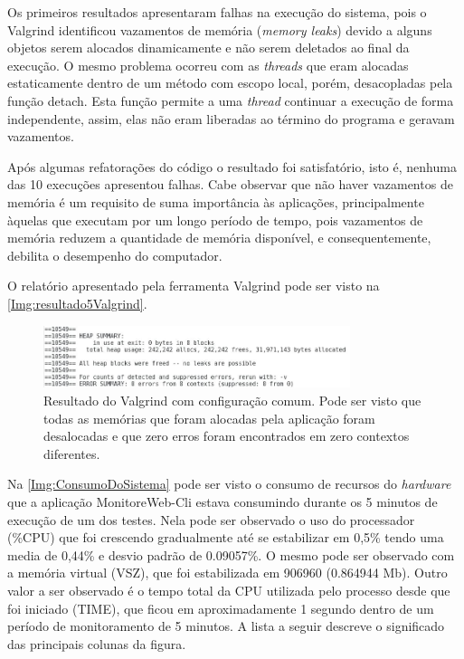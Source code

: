 Os primeiros resultados apresentaram falhas na execução do sistema, pois o Valgrind identificou vazamentos de memória (\textit{memory leaks}) devido a alguns objetos serem alocados dinamicamente e não serem deletados ao final da execução. O mesmo problema ocorreu com as \textit{threads} que eram alocadas estaticamente dentro de um método com escopo local, porém, desacopladas pela função detach. Esta função permite a uma \textit{thread} continuar a execução de forma independente, assim, elas não eram liberadas ao término do programa e geravam vazamentos.

Após algumas refatorações do código o resultado foi satisfatório, isto é, nenhuma das 10 execuções apresentou falhas. Cabe observar que não haver vazamentos de memória é um requisito de suma importância às aplicações, principalmente àquelas que executam por um longo período de tempo, pois vazamentos de memória reduzem a quantidade de memória disponível, e consequentemente, debilita o desempenho do computador.

O relatório apresentado pela ferramenta Valgrind pode ser visto na \autoref{Img:resultado5Valgrind}.


\begin{figure}[H]
	\centering
	\includegraphics[width=0.8\textwidth]{figuras/monitorWebCliTeste1/resultado5.JPG}
	\caption[Resultado do Valgrind com configuração comum.]{Resultado do Valgrind com configuração comum. Pode ser visto que todas as memórias que foram alocadas pela aplicação foram desalocadas e que zero erros foram encontrados em zero contextos diferentes.}
	\label{Img:resultado5Valgrind}
\end{figure}



Na \autoref{Img:ConsumoDoSistema} pode ser visto o consumo de recursos do \textit{hardware} que a aplicação MonitoreWeb-Cli estava consumindo durante os 5 minutos de execução de um dos testes. Nela pode ser observado o uso do processador (\%CPU) que foi crescendo gradualmente até se estabilizar em 0,5\% tendo uma media de 0,44\% e desvio padrão de 0.09057\%. O mesmo pode ser observado com a memória virtual (VSZ), que foi estabilizada em 906960 (0.864944 Mb). Outro valor a ser observado é o tempo total da CPU utilizada pelo processo desde que foi iniciado (TIME), que ficou em aproximadamente 1 segundo dentro de um período de monitoramento de 5 minutos. A lista a seguir descreve o significado das principais colunas da figura.



